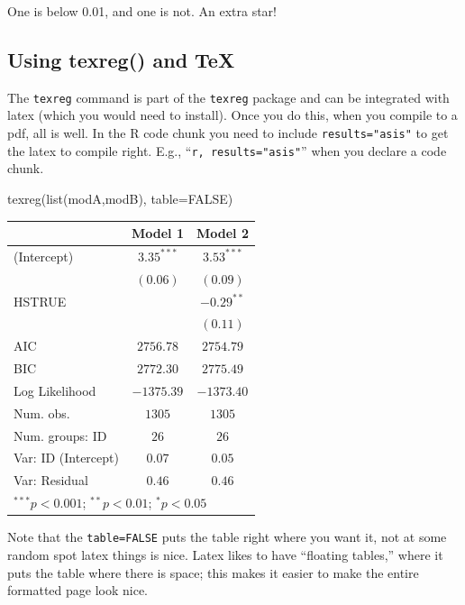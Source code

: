 \documentclass[
  letterpaper,
  DIV=11,
  numbers=noendperiod]{scrreprt}
\newenvironment{Shaded}{\begin{snugshade}}{\end{snugshade}}
\newcommand{\AttributeTok}[1]{\textcolor[rgb]{0.49,0.56,0.16}{#1}}
\newcommand{\ConstantTok}[1]{\textcolor[rgb]{0.53,0.00,0.00}{#1}}
\newcommand{\FunctionTok}[1]{\textcolor[rgb]{0.02,0.16,0.49}{#1}}
\newcommand{\NormalTok}[1]{\textcolor[rgb]{0.00,0.44,0.13}{#1}}
\begin{document}
One is below 0.01, and one is not. An extra star!

\hypertarget{using-texreg-and-tex}{%
\subsection{Using texreg() and TeX}\label{using-texreg-and-tex}}

The \texttt{texreg} command is part of the \texttt{texreg} package and
can be integrated with latex (which you would need to install). Once you
do this, when you compile to a pdf, all is well. In the R code chunk you
need to include \texttt{results="asis"} to get the latex to compile
right. E.g., ``\texttt{r,\ results="asis"}'' when you declare a code
chunk.

\begin{Shaded}
\begin{Highlighting}[]
\FunctionTok{texreg}\NormalTok{(}\FunctionTok{list}\NormalTok{(modA,modB), }\AttributeTok{table=}\ConstantTok{FALSE}\NormalTok{)}
\end{Highlighting}
\end{Shaded}

\begin{tabular}{l c c}
\hline
 & Model 1 & Model 2 \\
\hline
(Intercept)         & $3.35^{***}$ & $3.53^{***}$ \\
                    & $(0.06)$     & $(0.09)$     \\
HSTRUE              &              & $-0.29^{**}$ \\
                    &              & $(0.11)$     \\
\hline
AIC                 & $2756.78$    & $2754.79$    \\
BIC                 & $2772.30$    & $2775.49$    \\
Log Likelihood      & $-1375.39$   & $-1373.40$   \\
Num. obs.           & $1305$       & $1305$       \\
Num. groups: ID     & $26$         & $26$         \\
Var: ID (Intercept) & $0.07$       & $0.05$       \\
Var: Residual       & $0.46$       & $0.46$       \\
\hline
\multicolumn{3}{l}{\scriptsize{$^{***}p<0.001$; $^{**}p<0.01$; $^{*}p<0.05$}}
\end{tabular}

Note that the \texttt{table=FALSE} puts the table right where you want
it, not at some random spot latex things is nice. Latex likes to have
``floating tables,'' where it puts the table where there is space; this
makes it easier to make the entire formatted page look nice.
\end{document}
